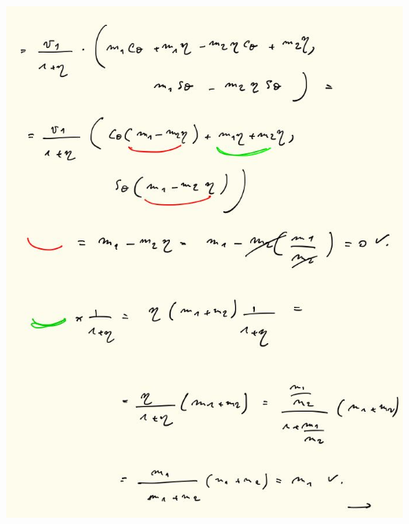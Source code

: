 \documentclass[fleqn]{article}
\begin{document}
\begin{center}
  \includegraphics[height=18.5cm, width=18cm]{8.JPG}
\end{center}

\pagebreak
\end{document}
